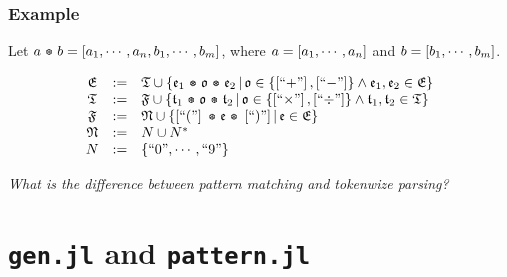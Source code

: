\documentclass[12pt,b5paper]{article}
\begin{document}

\subsubsection{Example}

Let \(a \vcat b= \vect{a_1,\cdots,a_n,b_1,\cdots,b_m}\), where \(a=\left[ a_1,\cdots,a_n \right]\) and \(b=\left[ b_1,\cdots,b_m \right]\).

\[
\begin{array}{ccl}
	\mathfrak{E} & := &
	\mathfrak{T} \cup \setdef{\mathfrak{e}_1 \vcat \mathfrak{o} \vcat \mathfrak{e}_2}{\mathfrak{o}\in\set{\vect{\quotemath{+}},\vect{\quotemath{-}}} \land \mathfrak{e}_1,\mathfrak{e}_2 \in \mathfrak{E}} \\

	\mathfrak{T} & := &
	\mathfrak{F} \cup \setdef{\mathfrak{t}_1 \vcat \mathfrak{o} \vcat \mathfrak{t}_2}{\mathfrak{o}\in\set{\vect{\quotemath{\times}},\vect{\quotemath{\div}}} \land \mathfrak{t}_1,\mathfrak{t}_2 \in \mathfrak{T}} \\

	\mathfrak{F} & := &
	\mathfrak{N} \cup \setdef{\vect{\quotemath{(}} \vcat \mathfrak{e} \vcat \vect{\quotemath{)}}}{\mathfrak{e} \in \mathfrak{E}} \\

	\mathfrak{N} & := &
	N \cup N^* \\

	N & := & \set{\text{\quotemath{0}}, \cdots, \text{\quotemath{9}}}
\end{array}
\]

\textit{What is the difference between pattern matching and tokenwize parsing?}

\newpage
\section{\texttt{gen.jl} and \texttt{pattern.jl}}
\end{document}

